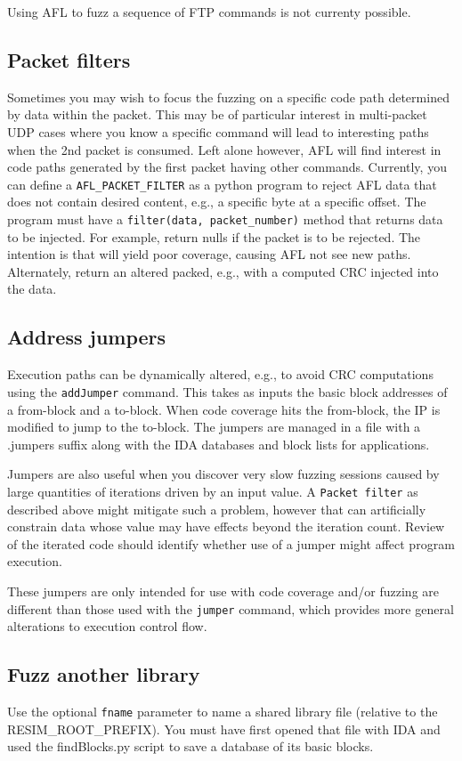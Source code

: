 \documentclass[titlepage]{article}
\begin{document}
Using AFL to fuzz a sequence of FTP commands is not currenty possible.


\subsection{Packet filters}
Sometimes you may wish to focus the fuzzing on a specific code path determined by data within the packet.  This may be of particular
interest in multi-packet UDP cases where you know a specific command will lead to interesting paths when the 2nd packet is consumed.
Left alone however, AFL will find interest in code paths generated by the first packet having other commands.  Currently, you can
define a {\tt AFL\_PACKET\_FILTER} as a python program to reject AFL data that does not contain desired content, e.g., a specific byte
at a specific offset.  The program must have a {\tt filter(data, packet\_number)} method that returns data to be injected.  
For example, return nulls if the packet is to be rejected.  The intention is that will yield poor coverage, causing AFL not see new paths.
Alternately, return an altered packed, e.g., with a computed CRC injected into the data.

\subsection{Address jumpers}
\label{jumpers}
Execution paths can be dynamically altered, e.g., to avoid CRC computations using the {\tt addJumper} command.  This takes as inputs
the basic block addresses of a from-block and a to-block. When code coverage hits the from-block, the IP is modified to jump to the
to-block.  The jumpers are managed in a file with a .jumpers suffix along with the IDA databases and block lists for applications.

Jumpers are also useful when you discover very slow fuzzing sessions caused by large quantities of iterations driven by an input value.
A {\tt Packet filter} as described above might mitigate such a problem, however that can artificially constrain data whose value may
have effects beyond the iteration count.  Review of the iterated code should identify whether use of a jumper might affect program
execution.

These jumpers are only intended for use with code coverage and/or fuzzing are different than those used with the {\tt jumper} command,
which provides more general alterations to execution control flow.

\subsection{Fuzz another library}
Use the optional {\tt fname} parameter to name a shared library file (relative to the RESIM\_ROOT\_PREFIX).  You must have first
opened that file with IDA and used the findBlocks.py script to save a database of its basic blocks.
\end{document}
